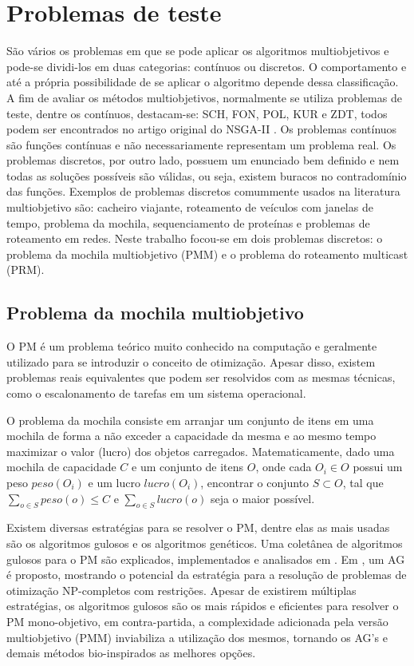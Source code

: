 \chapter[Problemas de teste]{Problemas de teste}

São vários os problemas em que se pode aplicar os algoritmos multiobjetivos e pode-se dividi-los em duas categorias: contínuos ou discretos. O comportamento e até a própria possibilidade de se aplicar o algoritmo depende dessa classificação. A fim de avaliar os métodos multiobjetivos, normalmente se utiliza problemas de teste, dentre os contínuos, destacam-se: SCH, FON, POL, KUR e ZDT, todos podem ser encontrados no artigo original do NSGA-II \cite{Deb2002}. Os problemas contínuos são funções contínuas e não necessariamente representam um problema real. Os problemas discretos, por outro lado, possuem um enunciado bem definido e nem todas as soluções possíveis são válidas, ou seja, existem buracos no contradomínio das funções. Exemplos de problemas discretos comummente usados na literatura multiobjetivo são: cacheiro viajante, roteamento de veículos com janelas de tempo, problema da mochila, sequenciamento de proteínas e problemas de roteamento em redes. Neste trabalho focou-se em dois problemas discretos: o problema da mochila multiobjetivo (PMM) e o problema do roteamento multicast (PRM).

\section{Problema da mochila multiobjetivo}

O \ac{PM} é um problema teórico muito conhecido na computação e geralmente utilizado para se introduzir o conceito de otimização. Apesar disso, existem problemas reais equivalentes que podem ser resolvidos com as mesmas técnicas, como o escalonamento de tarefas em um sistema operacional.

O problema da mochila consiste em arranjar um conjunto de itens em uma mochila de forma a não exceder a capacidade da mesma e ao mesmo tempo maximizar o valor (lucro) dos objetos carregados. Matematicamente, dado uma mochila de capacidade $C$ e um conjunto de itens $O$, onde cada $O_i \in O$ possui um peso $peso(O_i)$ e um lucro $lucro(O_i)$, encontrar o conjunto $S \subset O$, tal que $\sum_{o \in S} peso(o) \leq C$ e $\sum_{o \in S} lucro(o)$ seja o maior possível.

Existem diversas estratégias para se resolver o \ac{PM}, dentre elas as mais usadas são os algoritmos gulosos e os algoritmos genéticos. Uma coletânea de algoritmos gulosos para o \ac{PM} são explicados, implementados e analisados em \cite{Martello1990}.  Em \cite{Khuri1994}, um AG é proposto, mostrando o potencial da estratégia para a resolução de problemas de otimização NP-completos com restrições. Apesar de existirem múltiplas estratégias, os algoritmos gulosos são os mais rápidos e eficientes para resolver o PM mono-objetivo, em contra-partida, a complexidade adicionada pela versão multiobjetivo (PMM) inviabiliza a utilização dos mesmos, tornando os AG's e demais métodos bio-inspirados as melhores opções.

